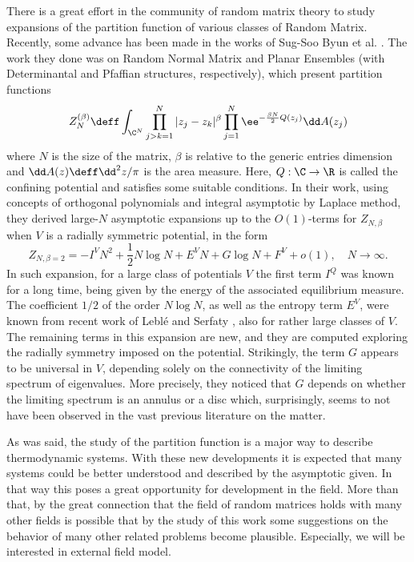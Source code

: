 There is a great effort in the community of random matrix theory to study expansions of the partition function of various classes of Random Matrix. Recently, some advance has been made in the works of Sug-Soo Byun et al. \cite{Byun_2023}. The work they done was on Random Normal Matrix and Planar Ensembles (with Determinantal and Pfaffian structures, respectively), which present partition functions
\begin{equation}
	Z_N^{(\beta)} \deff \int_{\C^N}  \prod_{j>k=1}^{N} |z_j - z_k|^\beta \prod_{j=1}^{N} \ee^{-\frac{\beta N}{2} Q(z_j)} \dd A(z_j)
\end{equation}
where $N$ is the size of the matrix, $\beta$ is relative to the generic entries dimension and $\dd A(z) \deff \dd^2 z/\pi$ is the area measure. Here, $Q: \C \rightarrow \R$ is called the confining potential and satisfies some suitable conditions. In their work, using concepts of orthogonal polynomials and integral asymptotic by Laplace method, they derived large-$N$ asymptotic expansions up to the $O(1)$-terms for  $Z_{N,\beta}$ when $V$ is a radially symmetric potential, in the form
%
$$
Z_{N,\beta=2}=-I^VN^2+\frac{1}{2}N\log N+E^V N+G\log N+F^V + o(1),\quad N\to \infty.
$$
%
In such expansion, for a large class of potentials $V$ the first term $I^Q$ was known for a long time, being given by the energy of the associated equilibrium measure. The coefficient $1/2$ of the order $N\log N$, as well as the entropy term $E^V$, were known from recent work of Leblé and Serfaty \cite{leblé2017large}, also for rather large classes of $V$. The remaining terms in this expansion are new, and they are computed exploring the radially symmetry imposed on the potential. Strikingly, the term $G$ appears to be universal in $V$, depending solely on the connectivity of the limiting spectrum of eigenvalues. More precisely, they noticed that $G$ depends on whether the limiting spectrum is an annulus or a disc which, surprisingly, seems to not have been observed in the vast previous literature on the matter. 

As was said, the study of the partition function is a major way to describe thermodynamic systems. With these new developments it is expected that many systems could be better understood and described by the asymptotic given. In that way this poses a great opportunity for development in the field. More than that, by the great connection that the field of random matrices holds with many other fields is possible that by the study of this work some suggestions on the behavior of many other related problems become plausible. Especially, we will be interested in external field model.

